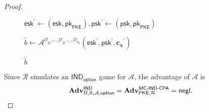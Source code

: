 \begin{proof}
\begin{figure}[h]
\begin{minipage}[t]{0.7\linewidth}
\begin{algorithm}[H]
\begin{algorithmic}[1]
		\State $\textsf{esk}^\prime \gets (\textsf{esk}, \textsf{pk}_{\textsf{PKE}}), \textsf{psk}^\prime \gets (\textsf{psk}, \textsf{pk}_{\textsf{PKE}})$

		\State $ \tilde{b} \gets {\mathcal{A}}^{\mathcal{O}_{\mathcal{B}^{(0)}}, \mathcal{O}_{\mathcal{B}^{(1)}}, \mathcal{O}_{\mathbf{c_y}} } (\textsf{esk}^\prime, \textsf{psk}^\prime, \mathbf{c_x}^\prime)$ \label{alg:red:ind-cpa:ind-esk-psk-ox-oc}

		\State \Return $\tilde{b}$

	\end{algorithmic}
	\end{algorithm}
	\end{minipage}
	
\end{figure}

\noindent Since $\mathcal{R}$ simulates an $\textsf{IND}_{\textsf{option}}$ game for $\mathcal{A}$, the advantage of $\mathcal{A}$ is
\[
	\mathbf{Adv}^{\textsf{IND}}_{\Pi, \mathbb{B}, \mathcal{A}, \textsf{option}} = \mathbf{Adv}^{\textsf{MC-IND-CPA}}_{\textsf{PKE}, \mathcal{R}} = \mathsf{negl}.
\]

\end{proof}
